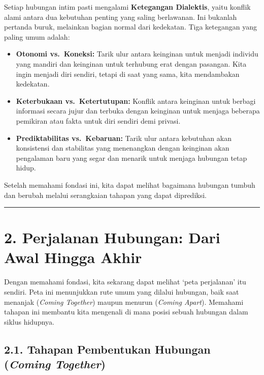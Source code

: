 \documentclass[
  letterpaper,
  DIV=11,
  numbers=noendperiod]{scrreprt}
\providecommand{\tightlist}{%
  \setlength{\itemsep}{0pt}\setlength{\parskip}{0pt}}
\begin{document}
Setiap hubungan intim pasti mengalami \textbf{Ketegangan Dialektis},
yaitu konflik alami antara dua kebutuhan penting yang saling berlawanan.
Ini bukanlah pertanda buruk, melainkan bagian normal dari kedekatan.
Tiga ketegangan yang paling umum adalah:

\begin{itemize}
\tightlist
\item
  \textbf{Otonomi vs.~Koneksi:} Tarik ulur antara keinginan untuk
  menjadi individu yang mandiri dan keinginan untuk terhubung erat
  dengan pasangan. Kita ingin menjadi diri sendiri, tetapi di saat yang
  sama, kita mendambakan kedekatan.
\item
  \textbf{Keterbukaan vs.~Ketertutupan:} Konflik antara keinginan untuk
  berbagi informasi secara jujur dan terbuka dengan keinginan untuk
  menjaga beberapa pemikiran atau fakta untuk diri sendiri demi privasi.
\item
  \textbf{Prediktabilitas vs.~Kebaruan:} Tarik ulur antara kebutuhan
  akan konsistensi dan stabilitas yang menenangkan dengan keinginan akan
  pengalaman baru yang segar dan menarik untuk menjaga hubungan tetap
  hidup.
\end{itemize}

Setelah memahami fondasi ini, kita dapat melihat bagaimana hubungan
tumbuh dan berubah melalui serangkaian tahapan yang dapat diprediksi.

\begin{center}\rule{0.5\linewidth}{0.5pt}\end{center}

\section{2. Perjalanan Hubungan: Dari Awal Hingga
Akhir}\label{perjalanan-hubungan-dari-awal-hingga-akhir}

Dengan memahami fondasi, kita sekarang dapat melihat `peta perjalanan'
itu sendiri. Peta ini menunjukkan rute umum yang dilalui hubungan, baik
saat menanjak (\emph{Coming Together}) maupun menurun (\emph{Coming
Apart}). Memahami tahapan ini membantu kita mengenali di mana posisi
sebuah hubungan dalam siklus hidupnya.

\subsection{\texorpdfstring{2.1. Tahapan Pembentukan Hubungan
(\emph{Coming
Together})}{2.1. Tahapan Pembentukan Hubungan (Coming Together)}}\label{tahapan-pembentukan-hubungan-coming-together}
\end{document}
